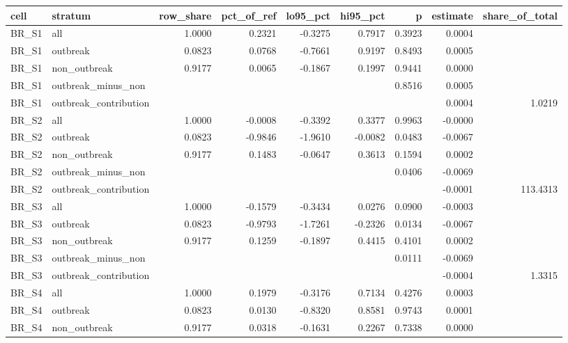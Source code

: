 \begin{tabular}{llrrrrrrr}
\toprule
cell & stratum & row\_share & pct\_of\_ref & lo95\_pct & hi95\_pct & p & estimate & share\_of\_total \\
\midrule
BR\_S1 & all & 1.0000 & 0.2321 & -0.3275 & 0.7917 & 0.3923 & 0.0004 &  \\
BR\_S1 & outbreak & 0.0823 & 0.0768 & -0.7661 & 0.9197 & 0.8493 & 0.0005 &  \\
BR\_S1 & non\_outbreak & 0.9177 & 0.0065 & -0.1867 & 0.1997 & 0.9441 & 0.0000 &  \\
BR\_S1 & outbreak\_minus\_non &  &  &  &  & 0.8516 & 0.0005 &  \\
BR\_S1 & outbreak\_contribution &  &  &  &  &  & 0.0004 & 1.0219 \\
BR\_S2 & all & 1.0000 & -0.0008 & -0.3392 & 0.3377 & 0.9963 & -0.0000 &  \\
BR\_S2 & outbreak & 0.0823 & -0.9846 & -1.9610 & -0.0082 & 0.0483 & -0.0067 &  \\
BR\_S2 & non\_outbreak & 0.9177 & 0.1483 & -0.0647 & 0.3613 & 0.1594 & 0.0002 &  \\
BR\_S2 & outbreak\_minus\_non &  &  &  &  & 0.0406 & -0.0069 &  \\
BR\_S2 & outbreak\_contribution &  &  &  &  &  & -0.0001 & 113.4313 \\
BR\_S3 & all & 1.0000 & -0.1579 & -0.3434 & 0.0276 & 0.0900 & -0.0003 &  \\
BR\_S3 & outbreak & 0.0823 & -0.9793 & -1.7261 & -0.2326 & 0.0134 & -0.0067 &  \\
BR\_S3 & non\_outbreak & 0.9177 & 0.1259 & -0.1897 & 0.4415 & 0.4101 & 0.0002 &  \\
BR\_S3 & outbreak\_minus\_non &  &  &  &  & 0.0111 & -0.0069 &  \\
BR\_S3 & outbreak\_contribution &  &  &  &  &  & -0.0004 & 1.3315 \\
BR\_S4 & all & 1.0000 & 0.1979 & -0.3176 & 0.7134 & 0.4276 & 0.0003 &  \\
BR\_S4 & outbreak & 0.0823 & 0.0130 & -0.8320 & 0.8581 & 0.9743 & 0.0001 &  \\
BR\_S4 & non\_outbreak & 0.9177 & 0.0318 & -0.1631 & 0.2267 & 0.7338 & 0.0000 &  \\

\end{tabular}
